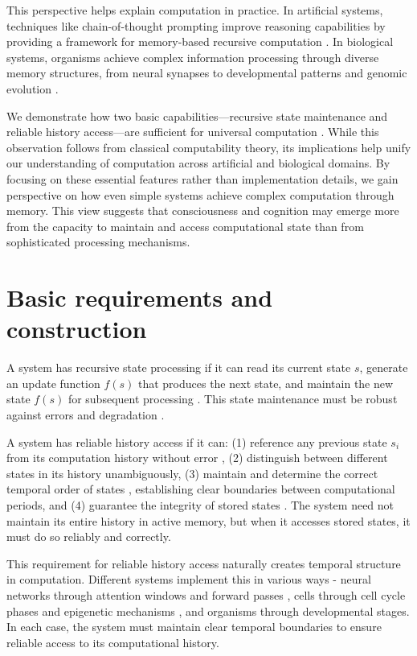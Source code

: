 \documentclass[12pt]{article}
\begin{document}
This perspective helps explain computation in practice. In artificial systems, techniques like chain-of-thought prompting improve reasoning capabilities by providing a framework for memory-based recursive computation \cite{wei2022chain,dickson2024trust,ahn2024recursive}. In biological systems, organisms achieve complex information processing through diverse memory structures, from neural synapses to developmental patterns and genomic evolution \cite{burrill2010making,espinosa2024molecular}.

We demonstrate how two basic capabilities---recursive state maintenance and reliable history access---are sufficient for universal computation \cite{bennett1989time,boyle2024memory}. While this observation follows from classical computability theory, its implications help unify our understanding of computation across artificial and biological domains. By focusing on these essential features rather than implementation details, we gain perspective on how even simple systems achieve complex computation through memory. This view suggests that consciousness and cognition may emerge more from the capacity to maintain and access computational state than from sophisticated processing mechanisms.

\section{Basic requirements and construction}

A system has recursive state processing if it can read its current state $s$, generate an update function $f(s)$ that produces the next state, and maintain the new state $f(s)$ for subsequent processing \cite{manuri2019state}. This state maintenance must be robust against errors and degradation \cite{yang2013survey}.

A system has reliable history access if it can: (1) reference any previous state $s_i$ from its computation history without error \cite{fu2024memory}, (2) distinguish between different states in its history unambiguously, (3) maintain and determine the correct temporal order of states \cite{berridge2014cell,pastor2020computation}, establishing clear boundaries between computational periods, and (4) guarantee the integrity of stored states \cite{lovkvist2021using}. The system need not maintain its entire history in active memory, but when it accesses stored states, it must do so reliably and correctly.

This requirement for reliable history access naturally creates temporal structure in computation. Different systems implement this in various ways - neural networks through attention windows and forward passes \cite{martini2015information,quentin2019differential}, cells through cell cycle phases and epigenetic mechanisms \cite{bruno2022epigenetic}, and organisms through developmental stages. In each case, the system must maintain clear temporal boundaries to ensure reliable access to its computational history.
\end{document}
